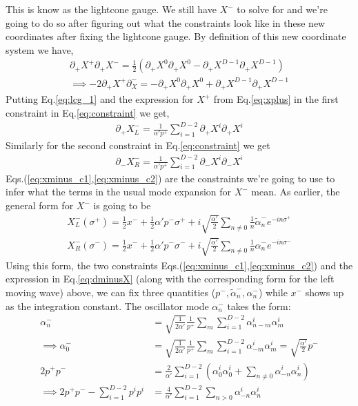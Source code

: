 \documentclass{article}
\providecommand{\brak}[1]{\ensuremath{\left(#1\right)}} %
\begin{document}
This is know as the lightcone gauge. We still have $X^-$ to solve for and we're going to do so after figuring out what the constraints look like in these new coordinates after fixing the lightcone gauge. By definition of this new coordinate system we have,
\begin{align}
	\partial_+X^+\partial_+X^- = \frac{1}{2}\brak{\partial_+X^0\partial_+X^0-\partial_+X^{D-1}\partial_+X^{D-1}}\\
	\implies -2\partial_+X^+\partial_X^-= -\partial_+X^0\partial_+X^0+\partial_+X^{D-1}\partial_+X^{D-1}\label{eq:lcg_1}
\end{align}
Putting Eq.\eqref{eq:lcg_1} and the expression for $X^+$ from Eq.\eqref{eq:xplus} in the first constraint in Eq.\eqref{eq:constraint} we get,
\begin{align}
	\partial_+X_L^- = \frac{1}{\alpha'p^+}\sum_{i=1}^{D-2}\partial_+X^i\partial_+X^i\label{eq:xminus_c1}
\end{align}
Similarly for the second constraint in Eq.\eqref{eq:constraint} we get
\begin{align}
	\partial_-X_R^- = \frac{1}{\alpha'p^+}\sum_{i=1}^{D-2}\partial_-X^i\partial_-X^i \label{eq:xminus_c2}
\end{align}
Eqs.(\ref{eq:xminus_c1},\ref{eq:xminus_c2}) are the constraints we're going to use to infer what the terms in the usual mode expansion for $X^-$ mean. As earlier, the general form for $X^-$ is going to be 
\begin{align}
	X^-_L(\sigma^+) = \frac{1}{2}x^- +\frac{1}{2}\alpha'p^-\sigma^++i\sqrt{\frac{\alpha'}{2}}\sum_{n\neq0}\frac{1}{n}\tilde{\alpha}_n^-e^{-in\sigma^+}\\
	X^-_R(\sigma^-) = \frac{1}{2}x^- +\frac{1}{2}\alpha'p^-\sigma^-+i\sqrt{\frac{\alpha'}{2}}\sum_{n\neq0}\frac{1}{n}{\alpha}_n^-e^{-in\sigma^-}
\end{align}
Using this form, the two constraints Eqs.(\ref{eq:xminus_c1},\ref{eq:xminus_c2}) and the expression in Eq.\eqref{eq:dminusX} (along with the corresponding form for the left moving wave) above, we can fix three quantities ($p^-,\tilde{\alpha}_n^-,\alpha_n^-$) while $x^-$ shows up as the integration constant. The oscillator mode $\alpha_n^-$ takes the form:
\begin{align}
	\alpha_n^- &= \sqrt{\frac{1}{2\alpha'}}\frac{1}{p^+}\sum_m\sum_{i=1}^{D-2}\alpha^i_{n-m}\alpha_m^i\\
	\implies \alpha_0^- &=  \sqrt{\frac{1}{2\alpha'}}\frac{1}{p^+}\sum_m\sum_{i=1}^{D-2}\alpha^i_{-m}\alpha_m^i = \sqrt{\frac{\alpha'}{2}}p^-\\
	2p^+p^- &= \frac{2}{\alpha'}\sum_{i=1}^{D-2}\brak{\alpha_0^i\alpha_0^i +\sum_{n\neq0}\alpha_{-n}^i\alpha_{n}^i}\\
	\implies 2p^+p^--\sum_{i=1}^{D-2}p^ip^i &= \frac{4}{\alpha'}\sum_{i=1}^{D-2}\sum_{n>0}\alpha_{-n}^i\alpha_n^i\label{eq:pp_lc}
\end{align}
\end{document}
